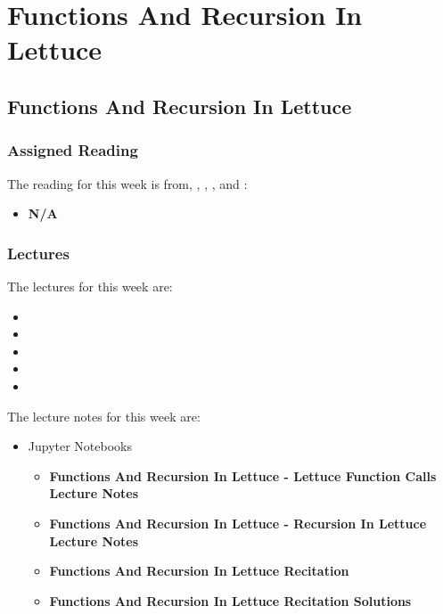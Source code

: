 \clearpage

\renewcommand{\ChapTitle}{Functions And Recursion In Lettuce}
\renewcommand{\SectionTitle}{Functions And Recursion In Lettuce}

\chapter{\ChapTitle}

\section{\SectionTitle}

\subsection{Assigned Reading}

The reading for this week is from, \AtomicScalaBook, \EssOfPPLBook, \FuncOfPPLBook, and \ProgInScalaBook:

\begin{itemize}
    \item \textbf{N/A}
\end{itemize}

\subsection{Lectures}

The lectures for this week are:

\begin{itemize}
    \item {}
    \item {}
    \item {}
    \item {}
    \item {}
\end{itemize}

\noindent The lecture notes for this week are:

\begin{itemize}
    \item Jupyter Notebooks
    \begin{itemize}
        \item \textbf{Functions And Recursion In Lettuce - Lettuce Function Calls Lecture Notes}
        \item \textbf{Functions And Recursion In Lettuce - Recursion In Lettuce Lecture Notes}
        \item \textbf{Functions And Recursion In Lettuce Recitation}
        \item \textbf{Functions And Recursion In Lettuce Recitation Solutions}
    \end{itemize}
\end{itemize}

